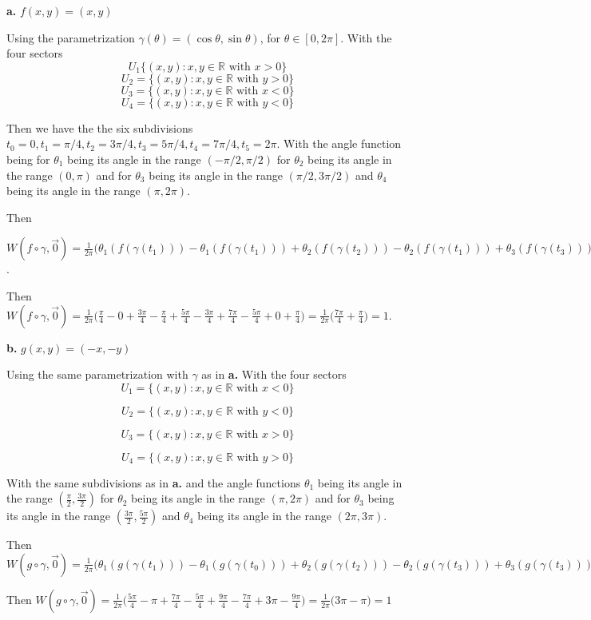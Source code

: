 \documentclass{amsart}
\theoremstyle{plain}
\theoremstyle{definition}
\theoremstyle{remark}
\begin{document}
\vspace{.1in}
{\bfseries a.}  $f(x,y) = (x,y)$
{

Using the parametrization  $\gamma(\theta)=(\cos \theta ,\sin \theta)$, for $\theta \in [0,2\pi]$. With the four sectors $$U_1\{(x,y):x,y\in \mathbb{R} \text{ with }x>0\}$$
$$U_2=\{(x,y):x,y\in \mathbb{R} \text{ with }y>0\}$$
$$U_3=\{(x,y):x,y\in \mathbb{R} \text{ with } x<0\}$$
$$U_4=\{(x,y):x,y\in \mathbb{R} \text{ with } y<0\}$$

Then we have the the six subdivisions $t_0=0,t_1=\pi/4,t_2=3\pi/4,t_3=5\pi/4,t_4=7\pi/4,t_5=2\pi$. With the angle function being for $\theta_1$ being its angle in the range $(-\pi/2,\pi/2)$ for $\theta_2$ being its angle in the range $(0,\pi)$ and for $\theta_3$ being its angle in the range $(\pi/2,3\pi/2)$ and $\theta_4$ being its angle in the range $(\pi,2\pi)$. 

Then 

$W(f\circ \gamma ,\vec 0)=\frac{1}{2\pi}\big(\theta_1(f(\gamma(t_1)))-\theta_1(f(\gamma(t_1)))+\theta_2(f(\gamma(t_2)))-\theta_2(f(\gamma(t_1)))+\theta_3(f(\gamma(t_3)))-\theta_3(f(\gamma(t_2)))+\theta_4(f(\gamma(t_4)))-\theta_4(f(\gamma(t_3)))+\theta_1(f(\gamma(t_5)))-\theta_1(f(\gamma(t_4)))\big)$. 

Then $W(f\circ \gamma ,\vec 0)=\frac{1}{2\pi}\big( \frac{\pi}{4}-0 + \frac{3\pi}{4}-\frac{\pi}{4}+\frac{5\pi}{4}-\frac{3\pi}{4}+\frac{7\pi}{4}-\frac{5\pi}{4}+0 +\frac{\pi}{4} \big)=\frac{1}{2\pi}\big(\frac{7\pi}{4}+\frac{\pi}{4}\big)=1$. 





}

\vspace{.1in}
{\bfseries b.} $g(x,y) = (-x,-y)$

{ 
    Using the same parametrization with $\gamma$ as in {\bfseries a.} With the four sectors 
    $$U_1=\{(x,y): x,y\in \mathbb{R} \text{ with } x<0\}$$

    $$U_2=\{(x,y): x,y\in \mathbb{R} \text{ with } y<0\}$$

    $$U_3=\{(x,y): x,y\in \mathbb{R} \text{ with } x>0\}$$

    $$U_4=\{(x,y):x,y\in \mathbb{R} \text{ with } y>0\}$$

    With the same subdivisions as in {\bfseries a.} and the angle functions $\theta_1$ being its angle in the range $(\frac{\pi}{2},\frac{3\pi}{2})$ for $\theta_2$ being its angle in the range $(\pi,2\pi)$ and for $\theta_3$ being its angle in the range $(\frac{3\pi}{2},\frac{5\pi}{2})$ and $\theta_4$ being its angle in the range $(2\pi,3\pi)$. 

    Then $W(g\circ \gamma, \vec 0)=\frac{1}{2\pi}\big(\theta_1(g (\gamma (t_1)))-\theta_1(g(\gamma (t_0)))+\theta_2(g(\gamma(t_2)))-\theta_2(g(\gamma(t_3)))+\theta_3(g(\gamma(t_3)))-\theta_3(g(\gamma(t_2))) +\theta_4(g(\gamma(t_4)))-\theta_4(g(\gamma(t_3)))+\theta_1 (g(\gamma(t_5)))-\theta_1(g(\gamma(t_4))) \big)$

    Then $W(g\circ \gamma,\vec 0)=\frac{1}{2\pi}\big( \frac{5\pi}{4} - \pi+ \frac{7\pi}{4}-\frac{5\pi}{4}+\frac{9\pi}{4}-\frac{7\pi}{4} + 3\pi - \frac{9\pi}{4}  \big)=\frac{1}{2\pi}\big( 3\pi - \pi \big)=1$
}
\end{document}
